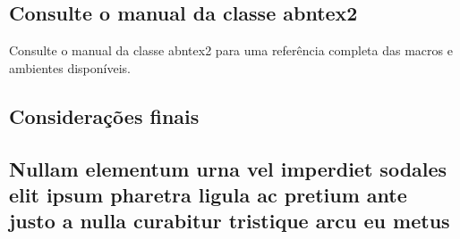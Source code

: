 \documentclass[
	article,			%
	11pt,				%
	oneside,			%
	a4paper,			%
	english,			%
	brazil,				%
	]{abntex2}
\begin{document}
\section{Consulte o manual da classe \textsf{abntex2}}

Consulte o manual da classe \textsf{abntex2} \cite{abntex2classe} para uma
referência completa das macros e ambientes disponíveis.

% 

\section*{Considerações finais}



\postextual




%
% 


\begin{apendicesenv}

\chapter{Nullam elementum urna vel imperdiet sodales elit ipsum pharetra ligula
ac pretium ante justo a nulla curabitur tristique arcu eu metus}
\lipsum[55-57]

\end{apendicesenv}
\end{document}
